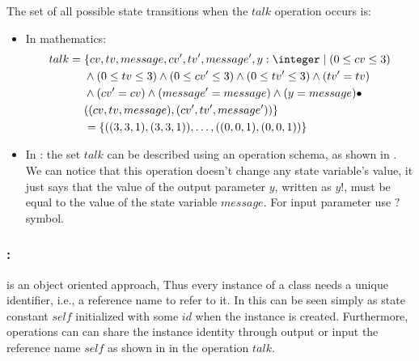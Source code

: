The set of all possible state transitions when the $talk$ operation occurs is:
\begin{itemize}
\item In mathematics: 
\begin{equation*}
\begin{aligned}
talk ={} & \{cv,tv,message,cv',tv',message',y: \integer\mid (0 \leq  cv \leq 3) \\
      &  \wedge (0 \leq  tv \leq 3)\wedge (0 \leq  cv' \leq 3) \wedge (0 \leq  tv' \leq 3) \wedge (tv' = tv)  \\
      & \wedge (cv' = cv) \wedge (message' = message) \wedge (y = message)\bullet \\
      &  \pair{\tripple{cv}{tv}{message}}{\tripple{cv'}{tv'}{message'}}\} \\
      & =\{\pair{\tripple{3}{3}{1}}{\tripple{3}{3}{1}},\dots,\pair{\tripple{0}{0}{1}}{\tripple{0}{0}{1}}\}
\end{aligned}
\end{equation*}
\item In \oz{}: the set $talk$ can be described using an operation schema, as shown in . We can notice that this operation doesn't change any state variable's value, it just says that the value of the output parameter $y$, written as $y!$, must be equal to the value of the state variable $message$. For input parameter use $?$ symbol.

\end{itemize}

\subsubsection{:} 
\label{instance_reference} 
\oz{} is an object oriented approach, Thus every instance of a class needs a unique identifier, i.e., a reference name to refer to it. In \oz{} this can be seen simply as state constant $self$ initialized with some $id$ when the instance is created. Furthermore, operations can can share the instance identity through output or input the reference name $self$ as shown in  in the operation $talk$.
